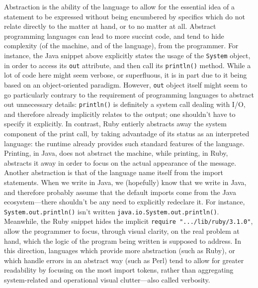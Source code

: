 Abstraction is the ability of the language to allow for the essential idea of a statement to be expressed without being encumbered by specifics which do not relate directly to the matter at hand, or to no matter at all. Abstract programming languages can lead to more succint code, and tend to hide complexity (of the machine, and of the language), from the programmer. For instance, the Java snippet above explicitly states the usage of the \lstinline{System} object, in order to access its \lstinline{out} attribute, and then call its \lstinline{println()} method. While a lot of code here might seem verbose, or superfluous, it is in part due to it being based on an object-oriented paradigm. However, \lstinline{out} object itself might seem to go particularly contrary to the requirement of programming languages to abstract out unnecessary details: \lstinline{println()} is definitely a system call dealing with I/O, and therefore already implicitly relates to the output; one shouldn't have to specify it explicitly. In contrast, Ruby entierly abstracts away the system component of the print call, by taking advantadge of its status as an interpreted language: the runtime already provides such standard features of the language. Printing, in Java, does not abstract the machine, while printing, in Ruby, abstracts it away in order to focus on the actual appearance of the message. Another abstraction is that of the language name itself from the import statements. When we write in Java, we (hopefully) know that we write in Java, and therefore probably assume that the default imports come from the Java ecosystem—there shouldn't be any need to explicitly redeclare it. For instance, \lstinline{System.out.println()} isn't written \lstinline{java.io.System.out.println()}. Meanwhile, the Ruby snippet hides the implicit \lstinline{require ".../lib/ruby/3.1.0"}, allow the programmer to focus, through visual clarity, on the real problem at hand, which the logic of the program being written is supposed to address. In this direction, languages which provide more abstraction (such as Ruby), or which handle errors in an abstract way (such as Perl) tend to allow for greater readability by focusing on the most import tokens, rather than aggregating system-related and operational visual clutter—also called verbosity.

